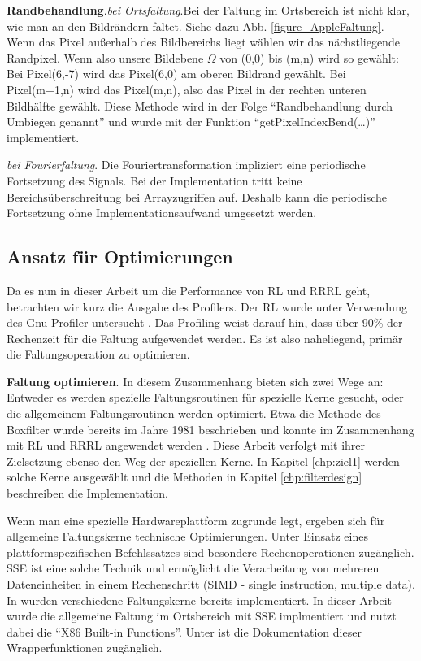 \documentclass[a4paper,12pt]{article}
\begin{document}
\textbf{Randbehandlung}.\emph{bei Ortsfaltung}.Bei der Faltung im Ortsbereich
ist nicht klar, wie man an den Bildrändern faltet. Siehe dazu Abb. \ref{figure_AppleFaltung}.
Wenn das Pixel außerhalb des Bildbereichs liegt wählen wir das nächstliegende
Randpixel. Wenn also unsere Bildebene $\Omega$ von (0,0) bis (m,n) wird so
gewählt: Bei Pixel(6,-7) wird das Pixel(6,0) am oberen Bildrand gewählt. Bei
Pixel(m+1,n) wird das Pixel(m,n), also das Pixel in der rechten unteren
Bildhälfte gewählt. Diese Methode wird in der Folge "`Randbehandlung durch
Umbiegen genannt"' und wurde mit der Funktion "`getPixelIndexBend(\ldots)"'
implementiert.

\emph{bei Fourierfaltung}. Die Fouriertransformation impliziert eine periodische
Fortsetzung des Signals. Bei der Implementation tritt
keine Bereichsüberschreitung bei Arrayzugriffen auf. Deshalb kann die
periodische Fortsetzung ohne Implementationsaufwand umgesetzt werden.

\subsection{Ansatz für Optimierungen}
Da es nun in dieser Arbeit um die Performance von RL und RRRL geht, betrachten
wir kurz die Ausgabe des Profilers. Der RL wurde unter Verwendung des Gnu
Profiler untersucht \cite{gprof}. Das Profiling weist darauf hin, dass über 90\%
der Rechenzeit für die Faltung aufgewendet werden. Es ist also naheliegend,
primär die Faltungsoperation zu optimieren. 

\textbf{Faltung optimieren}.
In diesem Zusammenhang bieten sich
zwei Wege an: Entweder es werden spezielle Faltungsroutinen für spezielle
Kerne gesucht, oder die allgemeinem Faltungsroutinen werden optimiert. 
Etwa die Methode des Boxfilter wurde bereits im Jahre 1981 beschrieben
\cite{mcdonnell} und konnte im Zusammenhang mit RL und RRRL angewendet werden \cite{vimpaper}. 
Diese Arbeit verfolgt mit ihrer Zielsetzung ebenso den Weg der
speziellen Kerne. In Kapitel \ref{chp:ziel1} werden solche Kerne ausgewählt und
die Methoden in Kapitel \ref{chp:filterdesign} beschreiben die Implementation. 

Wenn man eine spezielle Hardwareplattform zugrunde legt, ergeben sich für
allgemeine Faltungskerne technische Optimierungen. Unter Einsatz eines
plattformspezifischen Befehlssatzes sind besondere Rechenoperationen zugänglich.
SSE ist eine solche Technik und ermöglicht die Verarbeitung von mehreren
Dateneinheiten in einem Rechenschritt (SIMD - single instruction, multiple
data). In \cite{sse} wurden verschiedene Faltungskerne bereits implementiert. In
dieser Arbeit wurde die allgemeine Faltung im Ortsbereich mit SSE implmentiert
und nutzt dabei die "`X86 Built-in Functions"'. Unter \cite{gcc} ist die
Dokumentation dieser Wrapperfunktionen zugänglich.
\end{document}
